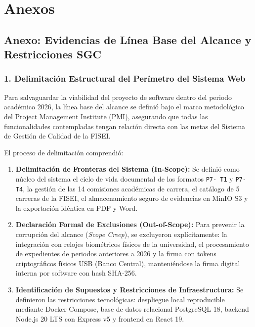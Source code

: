 \documentclass[12pt,a4paper]{article}
\begin{document}
\vspace{0.4cm}

\section{Anexos}

\subsection*{Anexo: Evidencias de Línea Base del Alcance y Restricciones SGC}

\subsubsection*{1. Delimitación Estructural del Perímetro del Sistema Web}
Para salvaguardar la viabilidad del proyecto de software dentro del periodo académico 2026, la línea base del alcance se definió bajo el marco metodológico del Project Management Institute (PMI), asegurando que todas las funcionalidades contempladas tengan relación directa con las metas del Sistema de Gestión de Calidad de la FISEI.

El proceso de delimitación comprendió:
\begin{enumerate}[leftmargin=1.5em, itemsep=2pt]
    \item \textbf{Delimitación de Fronteras del Sistema (In-Scope):} Se definió como núcleo del sistema el ciclo de vida documental de los formatos \texttt{P7- T1} y \texttt{P7- T4}, la gestión de las 14 comisiones académicas de carrera, el catálogo de 5 carreras de la FISEI, el almacenamiento seguro de evidencias en MinIO S3 y la exportación idéntica en PDF y Word.
    \item \textbf{Declaración Formal de Exclusiones (Out-of-Scope):} Para prevenir la corrupción del alcance (\textit{Scope Creep}), se excluyeron explícitamente: la integración con relojes biométricos físicos de la universidad, el procesamiento de expedientes de periodos anteriores a 2026 y la firma con tokens criptográficos físicos USB (Banco Central), manteniéndose la firma digital interna por software con hash SHA-256.
    \item \textbf{Identificación de Supuestos y Restricciones de Infraestructura:} Se definieron las restricciones tecnológicas: despliegue local reproducible mediante Docker Compose, base de datos relacional PostgreSQL 18, backend Node.js 20 LTS con Express v5 y frontend en React 19.
\end{enumerate}
\end{document}
